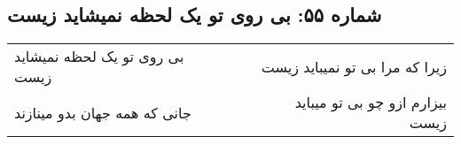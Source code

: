 \begin{center}
\section*{شماره ۵۵: بی روی تو یک لحظه نمیشاید زیست}
\label{sec:055}
\begin{longtable}{l p{0.5cm} r}
بی روی تو یک لحظه نمیشاید زیست
&&
زیرا که مرا بی تو نمیباید زیست
\\
جانی که همه جهان بدو مینازند
&&
بیزارم ازو چو بی تو میباید زیست
\\
\end{longtable}
\end{center}
